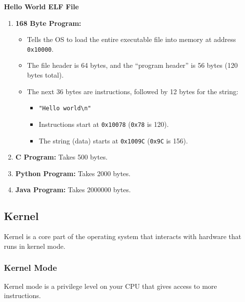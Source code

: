 \begin{example} \textbf{Hello World ELF File}
    \begin{enumerate}
        \item \textbf{168 Byte Program:}
        \begin{itemize}
            \item Tells the OS to load the entire executable file into memory at address \texttt{0x10000}.
            \item The file header is 64 bytes, and the ``program header'' is 56 bytes (120 bytes total).
            \item The next 36 bytes are instructions, followed by 12 bytes for the string:
                \begin{itemize}
                    \item \texttt{"Hello world\textbackslash n"}
                    \item Instructions start at \texttt{0x10078} (\texttt{0x78} is 120).
                    \item The string (data) starts at \texttt{0x1009C} (\texttt{0x9C} is 156).
                \end{itemize}
        \end{itemize} 
        \item \textbf{C Program:} Takes 500 bytes.
        \item \textbf{Python Program:} Takes 2000 bytes.
        \item \textbf{Java Program:} Takes 2000000 bytes.
    \end{enumerate}
\end{example}

\subsection{Kernel}
\begin{definition}
    Kernel is a core part of the operating system that interacts with hardware that runs in kernel mode. 
\end{definition}

\subsubsection{Kernel Mode}
\begin{definition}
    Kernel mode is a privilege level on your CPU that gives access to more instructions.
\end{definition}

